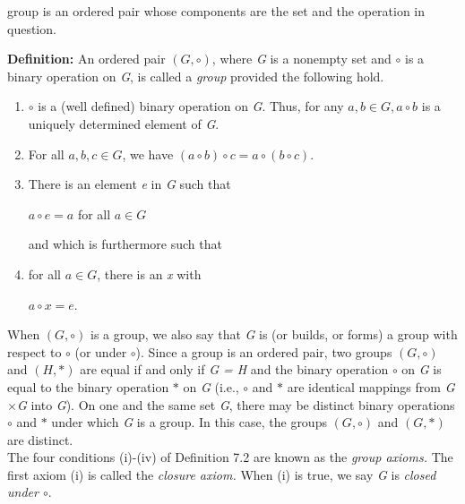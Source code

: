 \documentclass[11pt]{amsbook}
\begin{document}
	
	
	
	
	group is an ordered pair whose components are the set and the operation in question.
	
	\textbf{Definition:} An ordered pair $\left ( G, \circ \right )$, where \textit{G} is a nonempty set and $\circ$ is a binary operation on \textit{G}, is called a \textit{group} provided the following hold.
	
	\begin{enumerate}[label=(\roman* )]
		\item $\circ$ is a (well defined) binary operation on \textit{G}. Thus, for any $a, b \in G, a \circ b$ is a uniquely determined element of \textit{G}.
		\item For all $a, b, c\in G$, we have $(a\circ b)\circ c = a\circ (b\circ c)$.
		\item There is an element \textit{e} in \textit{G} such that 
		\begin{center}
			$a \circ e = a$ for all $a \in G$
		\end{center}
		and which is furthermore such that
		\item for all $a \in G$, there is an \textit{x}	with 
		\begin{center}
			$a \circ x = e$.
		\end{center}
	\end{enumerate}
	
	When $\left ( G, \circ \right )$ is a group, we also say that \textit{G} is (or builds, or forms) a group with respect to $\circ$ (or under $\circ$). Since a group is an ordered pair, two groups $\left ( G, \circ \right )$ and $\left ( H, \ast \right )$ are equal if and only if \textit{G = H} and the binary operation $\circ$ on \textit{G} is equal to the binary operation $\ast$ on \textit{G} (i.e., $\circ$ and $\ast$ are identical mappings from \textit{G$\times$G} into \textit{G}). On one and the same set \textit{G}, there may be distinct binary operations $\circ$ and $\ast$ under which \textit{G} is a group. In this case, the groups $\left ( G, \circ \right )$ and $\left ( G, \ast \right )$ are distinct.
	\\
	
	The four conditions (i)-(iv) of Definition 7.2 are known as the \textit{group axioms.} The first axiom (i) is called the \textit{closure axiom.} When (i) is true, we say \textit{G} is \textit{closed under $\circ$}.
	\\
	
\end{document}
